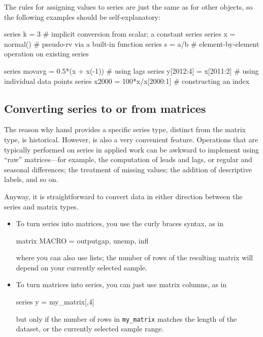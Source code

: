 The rules for assigning values to series are just the same as for
other objects, so the following examples should be self-explanatory:
\begin{code}
  series k = 3         # implicit conversion from scalar; a constant series
  series x = normal()  # pseudo-rv via a built-in function
  series s = a/b       # element-by-element operation on existing series

  series movavg = 0.5*(x + x(-1)) # using lags
  series y[2012:4] = x[2011:2]    # using individual data points
  series x2000 = 100*x/x[2000:1]  # constructing an index
\end{code}


\subsection{Converting series to or from matrices}

The reason why hansl provides a specific series type, distinct from
the matrix type, is historical. However, is also a very convenient
feature.  Operations that are typically performed on series in applied
work can be awkward to implement using ``raw'' matrices---for example,
the computation of leads and lags, or regular and seasonal
differences; the treatment of missing values; the addition of
descriptive labels, and so on.

Anyway, it is straightforward to convert data in either direction
between the series and matrix types.
\begin{itemize}
\item To turn series into matrices, you use the curly braces syntax,
  as in
  \begin{code}
    matrix MACRO = {outputgap, unemp, infl}
  \end{code}
  where you can also use lists; the number of rows of the resulting
  matrix will depend on your currently selected sample.
\item To turn matrices into series, you can just use matrix columns,
  as in
  \begin{code}
    series y = my_matrix[,4]
  \end{code}
  but only if the number of rows in \texttt{my\_matrix} matches the
  length of the dataset, or the currently selected sample range.
\end{itemize}

